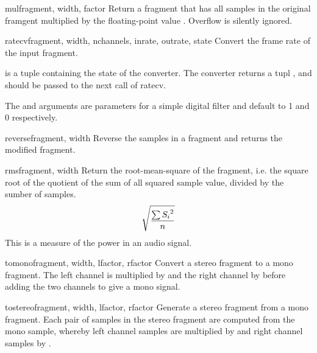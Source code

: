 \begin{funcdesc}{mul}{fragment, width, factor}
Return a fragment that has all samples in the original framgent
multiplied by the floating-point value .  Overflow is
silently ignored.
\end{funcdesc}

\begin{funcdesc}{ratecv}{fragment, width, nchannels, inrate, outrate, state}
Convert the frame rate of the input fragment.

 is a tuple containing the state of the converter.  The
converter returns a tupl ,
and  should be passed to the next call of ratecv.

The  and  arguments are parameters for a
simple digital filter and default to 1 and 0 respectively.
\end{funcdesc}

\begin{funcdesc}{reverse}{fragment, width}
Reverse the samples in a fragment and returns the modified fragment.
\end{funcdesc}

\begin{funcdesc}{rms}{fragment, width}
Return the root-mean-square of the fragment, i.e.
\iftexi
the square root of the quotient of the sum of all squared sample value,
divided by the sumber of samples.
\else
\begin{displaymath}
\catcode`_=8
\sqrt{\frac{\sum{{S_{i}}^{2}}}{n}}
\end{displaymath}
\fi
This is a measure of the power in an audio signal.
\end{funcdesc}

\begin{funcdesc}{tomono}{fragment, width, lfactor, rfactor} 
Convert a stereo fragment to a mono fragment.  The left channel is
multiplied by  and the right channel by 
before adding the two channels to give a mono signal.
\end{funcdesc}

\begin{funcdesc}{tostereo}{fragment, width, lfactor, rfactor}
Generate a stereo fragment from a mono fragment.  Each pair of samples
in the stereo fragment are computed from the mono sample, whereby left
channel samples are multiplied by  and right channel
samples by .
\end{funcdesc}

